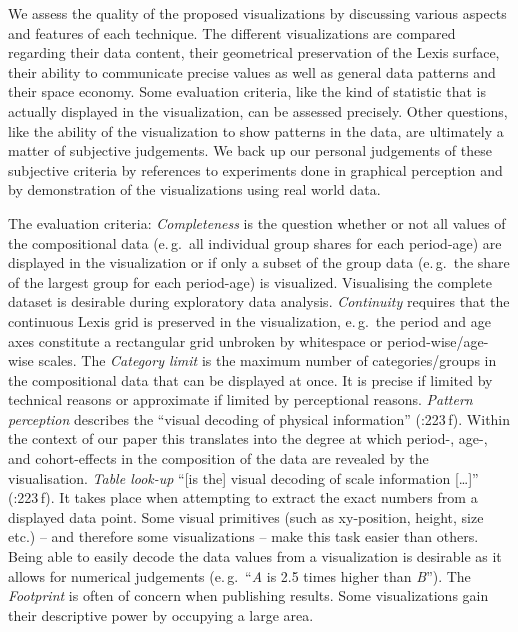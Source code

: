 \documentclass[a4paper]{scrartcl}
\begin{document}
We assess the quality of the proposed visualizations by discussing various aspects and features of each technique. The different visualizations are compared regarding their data content, their geometrical preservation of the Lexis surface, their ability to communicate precise values as well as general data patterns and their space economy. Some evaluation criteria, like the kind of statistic that is actually displayed in the visualization, can be assessed precisely. Other questions, like the ability of the visualization to show patterns in the data, are ultimately a matter of subjective judgements. We back up our personal judgements of these subjective criteria by references to experiments done in graphical perception and by demonstration of the visualizations using real world data.

The evaluation criteria:
\emph{Completeness} is the question whether or not all values of the compositional data (e.\,g.~all individual group shares for each period-age) are displayed in the visualization or if only a subset of the group data (e.\,g.~the share of the largest group for each period-age) is visualized. Visualising the complete dataset is desirable during exploratory data analysis.
\emph{Continuity} requires that the continuous Lexis grid is preserved in the visualization, e.\,g.~the period and age axes constitute a rectangular grid unbroken by whitespace or period-wise/age-wise scales.
The \emph{Category limit} is the maximum number of categories/groups in the compositional data that can be displayed at once. It is precise if limited by technical reasons or approximate if limited by perceptional reasons.
\emph{Pattern perception} describes the \enquote{visual decoding of physical information} (\cite{Cleveland1994}:223\,f). Within the context of our paper this translates into the degree at which  period-, age-, and cohort-effects in the composition of the data are revealed by the visualisation.
\emph{Table look-up} \enquote{[is the] visual decoding of scale information [\ldots]} (\cite{Cleveland1994}:223\,f). It takes place when attempting to extract the exact numbers from a displayed data point. Some visual primitives (such as xy-position, height, size etc.) -- and therefore some visualizations -- make this task easier than others. Being able to easily decode the data values from a visualization is desirable as it allows for numerical judgements (e.\,g.~\enquote{\emph{A} is 2.5 times higher than \emph{B}}).
The \emph{Footprint} is often of concern when publishing results. Some visualizations gain their descriptive power by occupying a large area.
\end{document}
